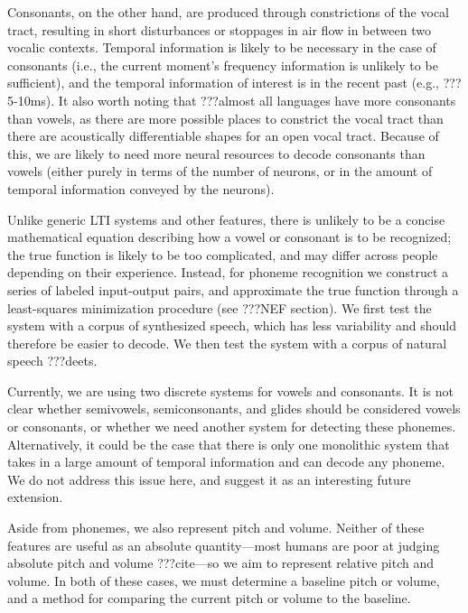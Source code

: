 Consonants, on the other hand, are produced
through constrictions of the vocal tract,
resulting in short disturbances or stoppages in air flow
in between two vocalic contexts.
Temporal information is likely to be necessary
in the case of consonants
(i.e., the current moment's frequency information
is unlikely to be sufficient),
and the temporal information of interest
is in the recent past (e.g., ???5-10ms).
It also worth noting that ???almost
all languages have more consonants than vowels,
as there are more possible places to constrict
the vocal tract than there are acoustically
differentiable shapes for an open vocal tract.
Because of this, we are likely to need
more neural resources to decode consonants
than vowels
(either purely in terms of the number of neurons,
or in the amount of temporal information conveyed
by the neurons).

Unlike generic LTI systems and other features,
there is unlikely to be a concise mathematical equation
describing how a vowel or consonant is to be recognized;
the true function is likely to be too complicated,
and may differ across people depending on their experience.
Instead, for phoneme recognition
we construct a series of labeled input-output pairs,
and approximate the true function
through a least-squares minimization procedure
(see ???NEF section).
We first test the system
with a corpus of synthesized speech,
which has less variability and should therefore
be easier to decode.
We then test the system
with a corpus of natural speech
???deets.


Currently, we are using two discrete systems
for vowels and consonants.
It is not clear whether
semivowels, semiconsonants, and glides
should be considered vowels or consonants,
or whether we need another system
for detecting these phonemes.
Alternatively, it could be the case
that there is only one monolithic system
that takes in a large amount of temporal information
and can decode any phoneme.
We do not address this issue here,
and suggest it as an interesting future extension.

Aside from phonemes, we also represent pitch and volume.
Neither of these features are useful
as an absolute quantity---most humans are poor
at judging absolute pitch and volume ???cite---so
we aim to represent relative pitch and volume.
In both of these cases,
we must determine a baseline pitch or volume,
and a method for comparing the current
pitch or volume to the baseline.

